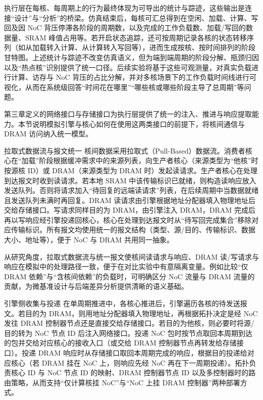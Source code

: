 执行层在每核、每周期上的行为最终体现为可导出的统计与踪迹，这些输出是连接“设计”与“分析”的桥梁。仿真结束后，每核可汇总得到在空闲、加载、计算、写回及因 NoC 背压停滞各阶段的周期数，以及完成的工作负载数、加载/写回的数据量、SRAM 峰值占用等。若开启状态追踪，还可按周期记录各核的状态转移序列（如从加载转入计算、从计算转入写回等），进而生成按核、按时间排列的阶段甘特图。上述统计与踪迹不改变仿真语义，但为端到端周期的阶段分解、瓶颈归因以及“热点核”识别提供了统一口径。后续实验将基于这些可观测量，对真实负载进行计算、访存与 NoC 背压的占比分解，并对多核场景下的工作负载时间线进行可视化，从而在系统级回答“时间花在哪里”“哪些核或哪些阶段主导了总周期”等问题。


第三章定义的网络接口与存储接口为执行层提供了统一的注入、推进与响应提取能力。本节说明模拟引擎与核心如何在使用这两类接口的前提下，将核间通信与 DRAM 访问纳入统一模型。


拉取式数据流与报文统一  核间数据采用拉取式（Pull-Based）数据流。消费者核心在“加载”阶段根据缓冲需求中的来源列表，向生产者核心（来源类型为“他核”时按源核 ID）或 DRAM（来源类型为 DRAM 时）发起读请求。生产者核心在处理到达报文时收到读请求。若本地 SRAM 中该传输标识已就绪，则构造读响应放入发送队列。否则将请求加入“待回复的远端读请求”列表，在后续周期中当数据就绪且发送队列未满时再回复。DRAM 读请求由引擎根据地址分配器填入物理地址后交给存储接口。写请求同样目的为 DRAM，由引擎注入 DRAM，DRAM 完成后再以写响应经引擎投递回核心，核心在处理到达报文时从“待写回完成集合”移除对应传输标识。所有报文均使用统一的报文结构（类型、源/目的、传输标识、数据大小、地址等），便于 NoC 与 DRAM 共用同一抽象\parencite{jiang2013booksim,luo2023ramulator2}。

从研究角度，拉取式数据流与统一报文使核间读请求与响应、DRAM 读/写请求与响应在模拟中的处理路径一致，便于在对比实验中有意隔离变量。例如比较“仅 DRAM 依赖”与“含核间依赖”的负载时，可明确区分 NoC 流量与 DRAM 流量的贡献，为微基准设计与后端差异分析提供清晰的语义基础。

引擎侧收集与投递  在单周期推进中，各核心推进后，引擎遍历各核的待发送报文。若目的为 DRAM，则用地址分配器填入物理地址，再根据拓扑决定是经 NoC 发往 DRAM 控制器节点还是直接交给存储接口。若目的为他核，则必要时将源/目的转为 NoC 节点 ID 后注入网络接口。投递 NoC 包时按节点取回本周期到达的包并交给对应核心的接收入口（或交给 DRAM 控制器节点再转发给存储接口）。投递 DRAM 响应时从存储接口取回本周期完成的响应，根据目的投递给对应核心（若 DRAM 挂在 NoC 上，则响应先经 NoC 再在下一周期投递）。拓扑负责核心 ID 与 NoC 节点 ID 的映射、DRAM 控制器节点 ID 以及多控制器时的路由策略，从而支持“仅计算核挂 NoC”与“NoC 上挂 DRAM 控制器”两种部署方式。

